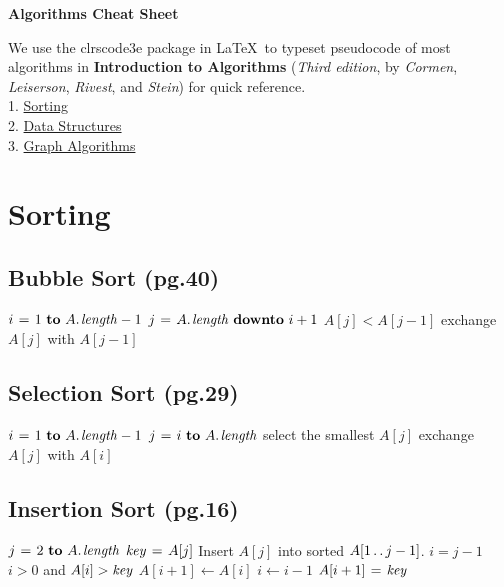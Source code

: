 \documentclass[twocolumn]{article}
\begin{document}
\begin{center}
     \Large{\textbf{Algorithms Cheat Sheet}} \\
\end{center}
We use the clrscode3e package in \LaTeX\ to typeset pseudocode of most algorithms in \textbf{Introduction to Algorithms} (\emph{Third edition}, by \emph{Cormen}, \emph{Leiserson}, \emph{Rivest}, and \emph{Stein}) for quick reference. \\
1. \hyperref[sorting]{Sorting} \\
2. \hyperref[data_structures]{Data Structures} \\
3. \hyperref[graph]{Graph Algorithms}


\section{Sorting}
\label{sorting}
\subsection{Bubble Sort (pg.40)}
\begin{codebox}
\li \For $i \gets 1 \To \attrib{A}{length}-1$
\li \Do \For $j \gets \attrib{A}{length} \Downto i+1$
\li     \Do \If $A[j] < A[j-1]$
\li 			\Then exchange $A[j]$ with $A[j-1]$
			\End
		\End
	\End
\end{codebox}

\subsection{Selection Sort (pg.29)}
\begin{codebox}
\li \For $i \gets 1 \To \attrib{A}{length}-1$
\li \Do 	\For $j \gets i \To \attrib{A}{length}$
\li 		\Do select the smallest $A[j]$
\li 			exchange $A[j]$ with $A[i]$
		\End
	\End
\end{codebox}

\subsection{Insertion Sort (pg.16)}
\begin{codebox}
\li \For $j \gets 2 \To \attrib{A}{length}$
\li \Do $\id{key} \gets A[j]$
\li 		\Comment Insert $A[j]$ into sorted $A[1 \mathinner{\ldotp\ldotp} j-1]$.
\li 		$i = j - 1$
\li 		\While $i > 0$ and $A[i] > \id{key}$
\li 		\Do $A[i+1] \gets A[i]$
\li 			$i \gets i-1$
		\End
\li 		$A[i+1] \gets \id{key}$
	\End
\end{codebox}
\end{document}
